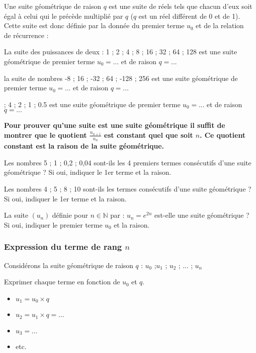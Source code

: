 \documentclass[a4paper,12pt]{scrartcl}
\begin{document}
Une suite géométrique de raison $q$ est une suite de réels tels que chacun d'eux soit égal à celui qui le précède multiplié par $q$ ($q$ est un réel différent de 0 et de 1). Cette suite est donc définie par la donnée du premier terme $u_0$ et de  la relation de récurrence : 


\exemple La suite des puissances de deux : 1 ; 2 ; 4 ; 8 ; 16 ; 32 ; 64 ; 128 est une suite géométrique de premier terme $u_0 = ...$ et de raison  $q = ...$

\exemple la suite de nombres -8 ; 16 ; -32 ; 64 ; -128 ; 256   est une suite géométrique de premier terme $u_0 = ...$ et de raison  $q = ...$

 ; 4 ; 2 ; 1 ; 0.5 est une suite géométrique de premier terme $u_0 = ...$ et de raison  $q = ...$

\vspace{1em}

\textbf{Pour prouver qu'une suite est une suite géométrique il suffit de montrer que le quotient $\frac{u_{n+1}}{u_n}$  est constant quel que soit $n$. Ce quotient constant est la raison de la suite géométrique.}

\exemple Les nombres 5 ; 1 ; 0,2 ; 0,04 sont-ils les 4 premiers termes consécutifs d'une suite géométrique ? Si oui, indiquer le 1er terme et la raison.


\exemple Les nombres 4 ; 5 ; 8 ; 10 sont-ils les termes consécutifs d'une suite géométrique ? Si oui, indiquer le 1er terme et la raison.


\exemple La suite $(u_n)$ définie pour $n \in \mathbb{N}$ par : $u_n = e^{2n}$ est-elle une suite géométrique ? Si oui, indiquer le premier terme $u_0$ et la raison.


\subsubsection{Expression  du terme de rang $n$}

Considérons la suite géométrique de raison $q$ : $u_0$ ;$u_1$ ; $u_2$ ; ... ; $u_n$

Exprimer chaque terme en  fonction de $u_0$ et $q$.
\begin{itemize}
\item $u_1 = u_0 × q$
\item $u_2 = u_1 × q =... $
\item $u_3 =...$
\item etc.
\end{itemize}
\end{document}
